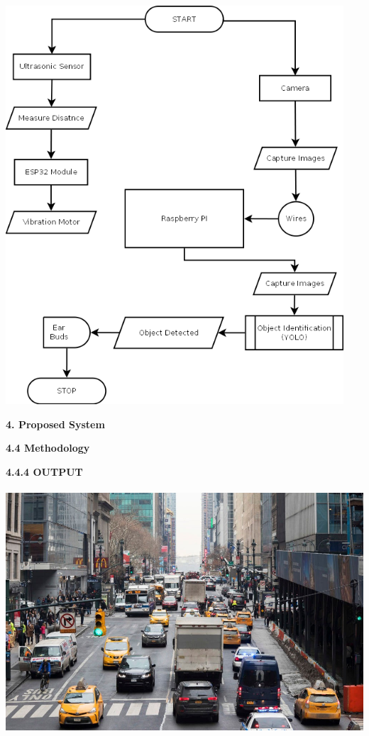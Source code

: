 \documentclass{article}
\begin{document}
\includegraphics[width=4.96111in,height=5.85556in]{media/14.bmp}

\textbf{4. Proposed System}

\textbf{4.4 Methodology}

\textbf{4.4.4 OUTPUT}

\includegraphics[width=5.41667in,height=3.60764in]{media/15.jpg}
\end{document}
